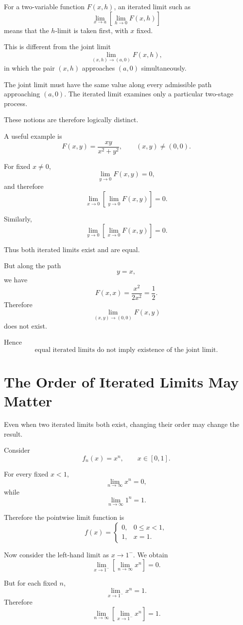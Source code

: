 \documentclass{essay}
\begin{document}
For a two-variable function \(F(x,h)\), an iterated limit such as
\[
\lim_{x\to a}
\left[
\lim_{h\to 0}F(x,h)
\right]
\]
means that the \(h\)-limit is taken first, with \(x\) fixed.

This is different from the joint limit
\[
\lim_{(x,h)\to(a,0)}F(x,h),
\]
in which the pair \((x,h)\) approaches \((a,0)\) simultaneously.

The joint limit must have the same value along every admissible path approaching \((a,0)\). The iterated limit examines only a particular two-stage process.

These notions are therefore logically distinct.

A useful example is
\[
F(x,y)
=
\frac{xy}{x^2+y^2},
\qquad
(x,y)\neq(0,0).
\]

For fixed \(x\neq0\),
\[
\lim_{y\to0}F(x,y)=0,
\]
and therefore
\[
\lim_{x\to0}\left[\lim_{y\to0}F(x,y)\right]=0.
\]

Similarly,
\[
\lim_{y\to0}\left[\lim_{x\to0}F(x,y)\right]=0.
\]

Thus both iterated limits exist and are equal.

But along the path
\[
y=x,
\]
we have
\[
F(x,x)
=
\frac{x^2}{2x^2}
=
\frac12.
\]
Therefore
\[
\lim_{(x,y)\to(0,0)}F(x,y)
\]
does not exist.

Hence
\[
\boxed{
\text{equal iterated limits do not imply existence of the joint limit.}
}
\]

\section{The Order of Iterated Limits May Matter}

Even when two iterated limits both exist, changing their order may change the result.

Consider
\[
f_n(x)=x^n,
\qquad
x\in[0,1].
\]

For every fixed \(x<1\),
\[
\lim_{n\to\infty}x^n=0,
\]
while
\[
\lim_{n\to\infty}1^n=1.
\]

Therefore the pointwise limit function is
\[
f(x)
=
\begin{cases}
0, & 0\le x<1,\\
1, & x=1.
\end{cases}
\]

Now consider the left-hand limit as \(x\to1^{-}\). We obtain
\[
\lim_{x\to1^-}
\left[
\lim_{n\to\infty}x^n
\right]
=
0.
\]

But for each fixed \(n\),
\[
\lim_{x\to1^-}x^n=1.
\]
Therefore
\[
\lim_{n\to\infty}
\left[
\lim_{x\to1^-}x^n
\right]
=
1.
\]
\end{document}
